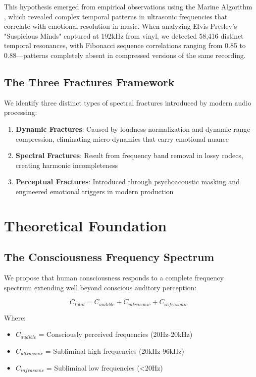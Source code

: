 \documentclass[12pt,a4paper]{article}
\begin{document}
This hypothesis emerged from empirical observations using the Marine Algorithm \cite{marine2025}, which revealed complex temporal patterns in ultrasonic frequencies that correlate with emotional resolution in music. When analyzing Elvis Presley's "Suspicious Minds" captured at 192kHz from vinyl, we detected 58,416 distinct temporal resonances, with Fibonacci sequence correlations ranging from 0.85 to 0.88—patterns completely absent in compressed versions of the same recording.

\subsection{The Three Fractures Framework}

We identify three distinct types of spectral fractures introduced by modern audio processing:

\begin{enumerate}
\item \textbf{Dynamic Fractures}: Caused by loudness normalization and dynamic range compression, eliminating micro-dynamics that carry emotional nuance
\item \textbf{Spectral Fractures}: Result from frequency band removal in lossy codecs, creating harmonic incompleteness
\item \textbf{Perceptual Fractures}: Introduced through psychoacoustic masking and engineered emotional triggers in modern production
\end{enumerate}

\section{Theoretical Foundation}

\subsection{The Consciousness Frequency Spectrum}

We propose that human consciousness responds to a complete frequency spectrum extending well beyond conscious auditory perception:

\begin{equation}
C_{total} = C_{audible} + C_{ultrasonic} + C_{infrasonic}
\end{equation}

Where:
\begin{itemize}
\item $C_{audible}$ = Consciously perceived frequencies (20Hz-20kHz)
\item $C_{ultrasonic}$ = Subliminal high frequencies (20kHz-96kHz)
\item $C_{infrasonic}$ = Subliminal low frequencies (<20Hz)
\end{itemize}
\end{document}
